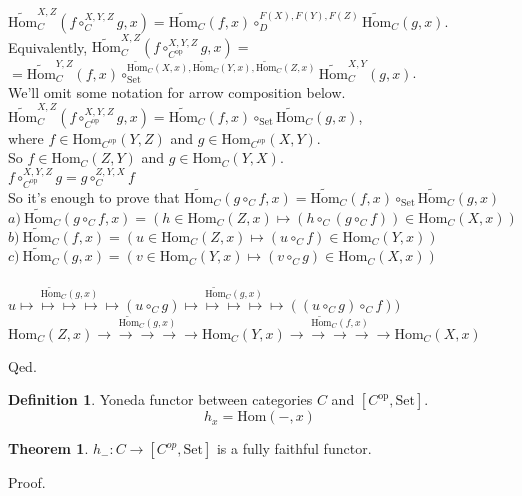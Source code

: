 \documentclass[10pt,a4paper]{article}
\theoremstyle{definition}
\newtheorem{definition}{Definition}[section]
\newtheorem{theorem}{Theorem}[section]
\newcommand{\Hom}{{\mbox{Hom}}}
\newcommand{\HomMor}{{\widetilde{\Hom}\mbox{}}}
\newcommand{\op}{{\mbox{op}}}
\newcommand{\Set}{{\mbox{Set}}}
\begin{document}
\begin{enumerate}
$\HomMor_C^{X,Z}(f\circ_C^{X,Y,Z} g, x)=\HomMor_C(f,x)\circ_D^{F(X),F(Y),F(Z)} \HomMor_C(g,x)$.\\
Equivalently, $\HomMor_C^{X,Z}(f\circ_{C^\op}^{X,Y,Z} g, x)=$\\ $=\HomMor_C^{Y,Z}(f,x)\circ_\Set^{\HomMor_C(X,x),\HomMor_C(Y,x),\HomMor_C(Z,x)} \HomMor_C^{X,Y}(g,x)$.\\
We'll omit some notation for arrow composition below.\\
$\HomMor_C^{X,Z}(f\circ_{C^\op}^{X,Y,Z} g, x)=\HomMor_C(f,x)\circ_\Set \HomMor_C(g,x)$,\\
where $f\in\Hom_{C^\op}(Y,Z)$ and $g\in\Hom_{C^\op}(X,Y)$.\\
So $f\in\Hom_{C}(Z,Y)$ and $g\in\Hom_{C}(Y,X)$.\\
$f\circ_{C^\op}^{X,Y,Z} g = g\circ_{C}^{Z,Y,X} f$\\
So it's enough to prove that $\HomMor_C(g\circ_C f, x) = \HomMor_C(f, x) \circ_\Set \HomMor_C(g, x)$\\
$a)\ \HomMor_C(g\circ_C f, x) = (h \in\Hom_C(Z,x) \mapsto (h \circ_C (g\circ_C f))\in\Hom_C(X,x))$\\
$b)\ \HomMor_C(f, x) = \left(u \in\Hom_C(Z,x) \mapsto (u \circ_C f)\in\Hom_C(Y,x)\right)$\\
$c)\ \HomMor_C(g, x) = \left(v \in\Hom_C(Y,x) \mapsto (v \circ_C g)\in\Hom_C\left(X,x\right)\right)$\\
\\
$u \stackrel{\HomMor_C(g, x)}{\mapsto\mapsto\mapsto\mapsto\mapsto} (u \circ_C g)\stackrel{\HomMor_C(g, x)}{\mapsto\mapsto\mapsto\mapsto\mapsto} ((u \circ_C g) \circ_C f))$
\\
$\Hom_C(Z,x) \stackrel{\HomMor_C(g, x)}{\to\to\to\to\to} \Hom_C(Y,x)\stackrel{\HomMor_C(f, x)}{\to\to\to\to\to} \Hom_C(X,x)$
\\
\end{enumerate}
Qed.
\begin{definition}
Yoneda functor between categories $C$ and $[C^\op,\Set]$.
$$h_x = \Hom(-, x)$$
\end{definition}
\begin{theorem}
$h_{-}:C\rightarrow [C^{op},\Set]$ is a fully faithful functor.
\end{theorem}
\noindent Proof.
\end{document}
